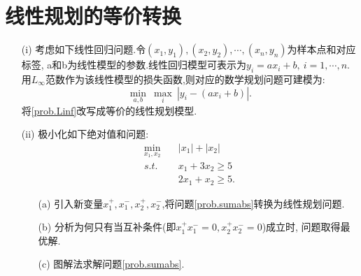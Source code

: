 \documentclass[10pt]{article}
\begin{document}
\section{线性规划的等价转换}
\begin{enumerate}
	\item[(i)]
	考虑如下线性回归问题.令$(x_1, y_1), (x_2, y_2),\cdots,(x_n, y_n)$为样本点和对应标签, a和b为线性模型的参数.线性回归模型可表示为$y_i = a x_i + b,\ i=1,\cdots,n$.
	用$L_{\infty}$范数作为该线性模型的损失函数,则对应的数学规划问题可建模为:
	\begin{equation}\label{prob.Linf}
	\min_{a, b}\ \max_i\ |y_i - (a x_i + b)|.
	\end{equation}
	将\eqref{prob.Linf}改写成等价的线性规划模型.

	\item[(ii)]
	极小化如下绝对值和问题:
	\begin{equation}\label{prob.sumabs}
	\begin{aligned}
		\min_{x_1, x_2}\quad &|x_1| + |x_2|\\
		s.t.\quad            &x_1 + 3x_2 \ge 5\\
							 &2x_1 + x_2 \ge 5.
	\end{aligned}
	\end{equation}
	\begin{enumerate}
		\item[(a)] 引入新变量$x_1^+,x_1^-, x_2^+,x_2^-$,将问题\eqref{prob.sumabs}转换为线性规划问题.
		\item[(b)] 分析为何只有当互补条件(即$x_1^+ x_1^-=0, x_2^+ x_2^-=0$)成立时, 问题取得最优解.
		\item[(c)] 图解法求解问题\eqref{prob.sumabs}.
	\end{enumerate}
\end{enumerate}
	
\end{document}
